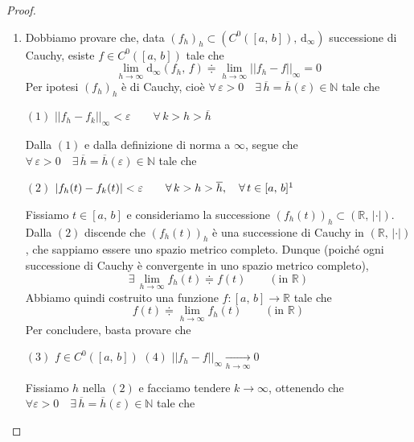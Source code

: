 \begin{proof}
\begin{enumerate}[labelindent=\parindent,leftmargin=*,label=\textnormal{(\roman*)},start=1]
\item Dobbiamo provare che, data $(f_h)_h \subset \left( C^0([a,\,b]),\,\mathrm{d}_{\infty} \right)$ successione di Cauchy, esiste $f \in C^0([a,\,b])$ tale che
$$
\lim_{h \rightarrow \infty} \mathrm{d}_{\infty} (f_h,\,f) \doteqdot \lim_{h \rightarrow \infty} ||f_h-f||_{\infty} = 0
$$
Per ipotesi $(f_h)_h$ è di Cauchy, cioè $\forall \, \varepsilon > 0 \quad \exists \, \overline{h} = \overline{h}(\varepsilon) \in \mathbb{N}$ tale che
\begin{center}
$\mathrm{(1)}$
\hfill
$\displaystyle
||f_h-f_k||_{\infty} < \varepsilon \qquad \forall \, k > h > \overline{h}
$
\hfill \null \\
\end{center}
Dalla $\mathrm{(1)}$ e dalla definizione di norma a $\infty$, segue che $\forall \, \varepsilon > 0 \quad \exists \, \overline{h} = \overline{h}(\varepsilon) \in \mathbb{N}$ tale che
\begin{center}
$\mathrm{(2)}$
\hfill
$\displaystyle
\left| f_h(t)-f_k(t) \right| < \varepsilon \qquad \forall \, k > h > \overline{h}, \quad \forall \, t \in [a,\,b]\footnotemark
$
\hfill \null \\
\end{center}
Fissiamo $t \in [a,\,b]$ e consideriamo la successione $(f_h(t))_h \subset (\mathbb{R},\,|\cdot|)$. Dalla $\mathrm{(2)}$ discende che $(f_h(t))_h$ è una successione di Cauchy in $(\mathbb{R},\,|\cdot|)$, che sappiamo essere uno spazio metrico completo. Dunque (poiché ogni successione di Cauchy è convergente in uno spazio metrico completo),
$$
\exists \, \lim_{h \rightarrow \infty} f_h(t) \doteqdot f(t) \qquad (\text{in } \mathbb{R})
$$
Abbiamo quindi costruito una funzione $f: [a,\,b] \longrightarrow \mathbb{R}$ tale che
$$
f(t) \doteqdot \lim_{h \rightarrow \infty} f_h(t) \qquad (\text{in } \mathbb{R})
$$
Per concludere, basta provare che
\begin{center}
$\mathrm{(3)}$
\hfill
$\displaystyle
f \in C^0([a,\,b])
$
\hfill \null \vskip 0pt
$\mathrm{(4)}$
\hfill
$\displaystyle
||f_h-f||_{\infty} \underset{h \rightarrow \infty}{\longrightarrow} 0
$
\hfill \null \\
\end{center}
Fissiamo $h$ nella $\mathrm{(2)}$ e facciamo tendere $k \rightarrow \infty$, ottenendo che $\forall \varepsilon > 0 \quad \exists \, \overline{h} = \overline{h}(\varepsilon) \in \mathbb{N}$ tale che

\end{enumerate}
\end{proof}
